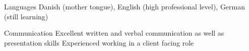 


\begin{cvskills}


\cvskill
{Languages} %
{Danish (mother tongue), English (high professional level), German (still learning)} %


\cvskill
{Communication} %
{Excellent written and verbal communication as well as presentation skills} %
\cvskill
{} %
{Experienced working in a client facing role} %


\end{cvskills}
